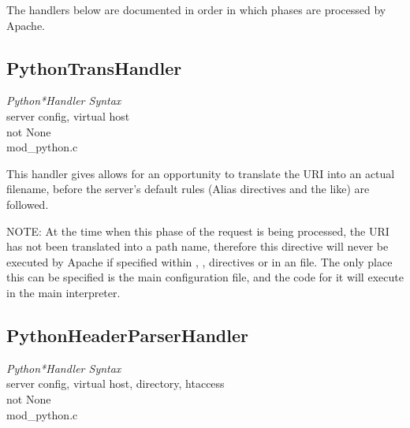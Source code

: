 The handlers below are documented in order in
which phases are processed by Apache.

\subsection{PythonTransHandler\label{dir-handlers-th}}

\emph{Python*Handler Syntax}\\
server config, virtual host\\
not None\\
mod_python.c

This handler gives allows for an opportunity to translate the URI into
an actual filename, before the server's default rules (Alias
directives and the like) are followed.

NOTE: At the time when this phase of the request is being processed,
the URI has not been translated into a path name, therefore this
directive will never be executed by Apache if specified within
, ,  directives or in
an  file. The only place this can be specified is the
main configuration file, and the code for it will execute in the
main interpreter.

\subsection{PythonHeaderParserHandler\label{dir-handlers-hph}}

\emph{Python*Handler Syntax}\\
server config, virtual host, directory, htaccess\\
not None\\
mod_python.c

